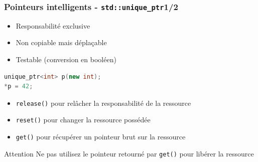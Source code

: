 \documentclass[C++.tex]{subfiles}
\begin{document}
\begin{frame}[fragile]
	\frametitle{Pointeurs intelligents - \lstinline|std::unique_ptr|\titlehfill{}1/2}
	\begin{itemize}
		\item Responsabilité exclusive
		\item Non copiable mais déplaçable
		\item Testable (conversion en booléen)
	\end{itemize}

	\begin{lstlisting}[language=C++]
unique_ptr<int> p(new int);
*p = 42;\end{lstlisting}

	\begin{itemize}
		\item \lstinline|release()| pour relâcher la responsabilité de la ressource


		\item \lstinline|reset()| pour changer la ressource possédée


		\item \lstinline|get()| pour récupérer un pointeur brut sur la ressource

	\end{itemize}

	\begin{alertblock}{Attention}
		Ne pas utilisez le pointeur retourné par \lstinline|get()| pour libérer la ressource
	\end{alertblock}
\end{frame}
\end{document}
